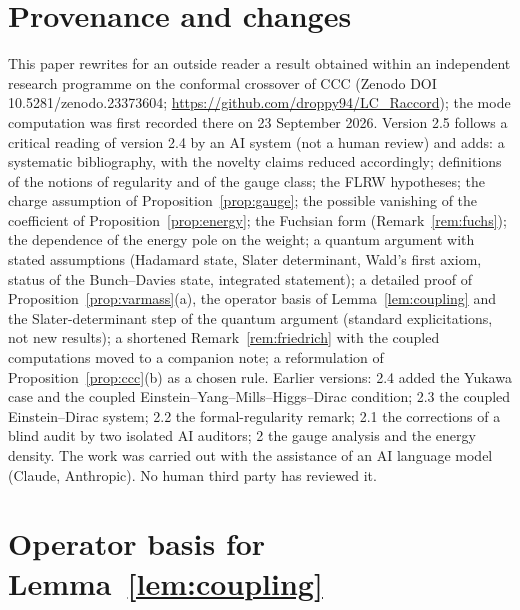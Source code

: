 \documentclass[11pt,a4paper]{article}
\theoremstyle{definition}
\begin{document}
\section*{Provenance and changes}
This paper rewrites for an outside reader a result obtained within an independent research programme on the conformal crossover of CCC (Zenodo DOI 10.5281/zenodo.23373604; \url{https://github.com/droppy94/LC_Raccord}); the mode computation was first recorded there on 23 September 2026. Version 2.5 follows a critical reading of version 2.4 by an AI system (not a human review) and adds: a systematic bibliography, with the novelty claims reduced accordingly; definitions of the notions of regularity and of the gauge class; the FLRW hypotheses; the charge assumption of Proposition~\ref{prop:gauge}; the possible vanishing of the coefficient of Proposition~\ref{prop:energy}; the Fuchsian form (Remark~\ref{rem:fuchs}); the dependence of the energy pole on the weight; a quantum argument with stated assumptions (Hadamard state, Slater determinant, Wald's first axiom, status of the Bunch--Davies state, integrated statement); a detailed proof of Proposition~\ref{prop:varmass}(a), the operator basis of Lemma~\ref{lem:coupling} and the Slater-determinant step of the quantum argument (standard explicitations, not new results); a shortened Remark~\ref{rem:friedrich} with the coupled computations moved to a companion note; a reformulation of Proposition~\ref{prop:ccc}(b) as a chosen rule. Earlier versions: 2.4 added the Yukawa case and the coupled Einstein--Yang--Mills--Higgs--Dirac condition; 2.3 the coupled Einstein--Dirac system; 2.2 the formal-regularity remark; 2.1 the corrections of a blind audit by two isolated AI auditors; 2 the gauge analysis and the energy density. The work was carried out with the assistance of an AI language model (Claude, Anthropic). No human third party has reviewed it.

\appendix
\section{Operator basis for Lemma~\ref{lem:coupling}}
\label{app:basis}
\end{document}
